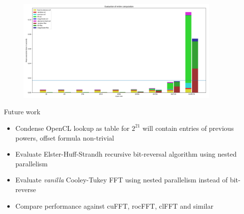 \documentclass[aspectratio=169]{beamer}
\begin{document}
\begin{frame}{}
\begin{columns}
\begin{column}{0.50\textwidth}
\begin{figure}
			\end{figure}
		\end{column}
	\end{columns}
	\endgroup
\end{frame}

\begin{frame}{}
	\begingroup
	\small
	\begin{figure}
		\centering
		\includegraphics[width=0.9\textwidth]{resources/images/total-results.png}
	\end{figure}
	\endgroup
\end{frame}

\begin{frame}{Future work}
	\begingroup
	\small
	\begin{itemize}
		\item Condense OpenCL lookup as table for $2^{21}$ will contain
			entries of previous powers, offset formula non-trivial
		\item Evaluate Elster-Huff-Strandh recursive bit-reversal algorithm
			using nested parallelism
		\item Evaluate \textit{vanilla} Cooley-Tukey FFT using nested
			parallelism instead of bit-reverse
		\item Compare performance against cuFFT, rocFFT, clFFT and similar
	\end{itemize}
	\endgroup
\end{frame}
\end{document}
